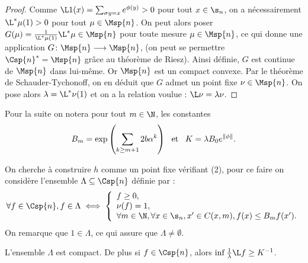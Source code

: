   \begin{proof}
    Comme $\L1(x) = \sum_{\sigma y = x}{e^{\phi(y)}} > 0$ pour tout $x \in \s_n$, on a nécessairement $\L^*\mu(1) > 0$ pour tout $\mu \in \Msp{n}$.
    On peut alors poser $G(\mu) = \frac 1 {\L^*\mu(1)}\L^*\mu \in \Msp{n}$ pour toute mesure $\mu \in \Msp{n}$,
    ce qui donne une application $G\colon \Msp{n} \longrightarrow \Msp{n}$,
    (on peut se permettre $\Csp{n}^* = \Msp{n}$ grâce au théorème de Riesz).
    Ainsi définie, $G$ est continue de $\Msp{n}$ dans lui-même. Or $\Msp{n}$ est un compact convexe.
    Par le théorème de Schauder-Tychonoff, on en déduit que $G$ admet un point fixe $\nu \in \Msp{n}$.
    On pose alors $\lambda = \L^*\nu(1)$ et on a la relation voulue : $\L\nu = \lambda\nu$.
  \end{proof}

  Pour la suite on notera pour tout $m \in \N$, les constantes
  $$B_m = \exp{\left(\sum_{k\geq m+1}{2b\alpha^k}\right)} \hspace{0.5em}\text{ et }\hspace{0.5em} K = \lambda B_0 e^{\lVert\phi\rVert}.$$

  On cherche à construire $h$ comme un point fixe vérifiant (2), pour ce faire on considère l'ensemble $\Lambda \subseteq \Csp{n}$
  définie par :
  $$\forall f \in \Csp{n}, f\in \Lambda \iff
  \left\{\begin{array}{l}
    f \geq 0, \\
    \nu(f) = 1, \\
    \forall m \in \N, \forall x \in \s_n, x' \in C(x, m), f(x) \leq B_m f(x').
  \end{array}\right.$$
  On remarque que $1 \in \Lambda$, ce qui assure que $\Lambda \not= \emptyset$.

  \begin{lemma}
    \label{lem:Lambda_compact}
    \leanok
    L'ensemble $\Lambda$ est compact. De plus si $f \in \Csp{n}$, alors $\inf \frac 1 \lambda \L f \geq K^{-1}$.
  \end{lemma}

